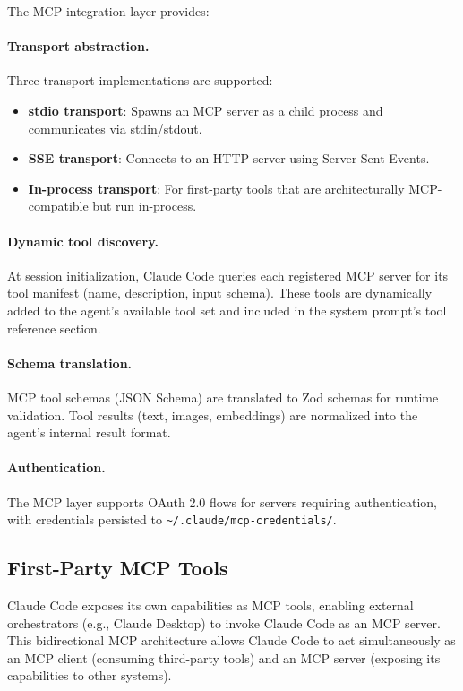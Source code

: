 \documentclass{article}
\begin{document}
The MCP integration layer provides:

\paragraph{Transport abstraction.} Three transport implementations are supported:
\begin{itemize}
  \item \textbf{stdio transport}: Spawns an MCP server as a child process and communicates via stdin/stdout.
  \item \textbf{SSE transport}: Connects to an HTTP server using Server-Sent Events.
  \item \textbf{In-process transport}: For first-party tools that are architecturally MCP-compatible but run in-process.
\end{itemize}

\paragraph{Dynamic tool discovery.} At session initialization, Claude Code queries each registered MCP server for its tool manifest (name, description, input schema). These tools are dynamically added to the agent's available tool set and included in the system prompt's tool reference section.

\paragraph{Schema translation.} MCP tool schemas (JSON Schema) are translated to Zod schemas for runtime validation. Tool results (text, images, embeddings) are normalized into the agent's internal result format.

\paragraph{Authentication.} The MCP layer supports OAuth 2.0 flows for servers requiring authentication, with credentials persisted to \texttt{\textasciitilde/.claude/mcp-credentials/}.

\subsection{First-Party MCP Tools}

Claude Code exposes its own capabilities as MCP tools, enabling external orchestrators (e.g., Claude Desktop) to invoke Claude Code as an MCP server. This bidirectional MCP architecture allows Claude Code to act simultaneously as an MCP client (consuming third-party tools) and an MCP server (exposing its capabilities to other systems).
\end{document}

